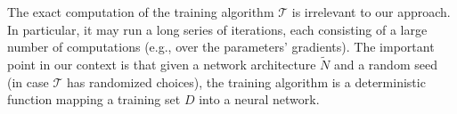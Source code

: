 The exact computation of the training algorithm  $\mathcal{T}$  is irrelevant to our approach. In particular, it may run a long series of iterations, each consisting of a large number of computations (e.g., over the parameters' gradients).  
The important point in our context is that given a network architecture $\widetilde{N}$ and a random seed (in case $\mathcal{T}$ has randomized choices), the training algorithm is a deterministic function mapping a training set $D$ into a neural network.  
  




